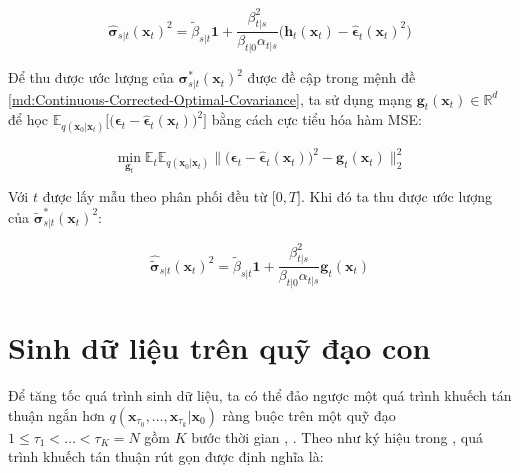 \documentclass[14pt, a4paper]{article}
\numberwithin{equation}{section}
\numberwithin{figure}{section}
\numberwithin{dl}{section}
\numberwithin{md}{section}
\numberwithin{bd}{section}
\numberwithin{dn}{section}
\numberwithin{hq}{section}
\begin{document}
    \begin{equation}
        \hat{\boldsymbol{\sigma}}_{s \vert t} (\boldsymbol{x}_t)^2 = \tilde{\beta}_{s \vert t} \boldsymbol{1} + \dfrac{\beta_{t \vert s}^2}{\beta_{t \vert 0} \alpha_{t \vert s}} \big( \boldsymbol{h}_t (\boldsymbol{x}_t) - \hat{\boldsymbol{\epsilon}}_t (\boldsymbol{x}_t)^2 \big)
    \end{equation}

    Để thu được ước lượng của $\boldsymbol{\sigma}_{s \vert t}^{\ast} (\boldsymbol{x}_t)^2$ được đề cập trong mệnh đề \ref{md:Continuous-Corrected-Optimal-Covariance}, ta sử dụng mạng $\boldsymbol{g}_t(\boldsymbol{x}_t) \in \mathbb{R}^d$ để học $\mathbb{E}_{q(\boldsymbol{x}_0 \vert \boldsymbol{x}_t)} \big \lbrack \big( \boldsymbol{\epsilon}_t - \hat{\boldsymbol{\epsilon}}_t (\boldsymbol{x}_t) \big)^2 \big \rbrack$ bằng cách cực tiểu hóa hàm MSE:

    \begin{equation}
        \min_{\boldsymbol{g}_t} \mathbb{E}_t \mathbb{E}_{q(\boldsymbol{x}_0 \vert \boldsymbol{x}_t)} \lVert \big( \boldsymbol{\epsilon}_t - \hat{\boldsymbol{\epsilon}}_t (\boldsymbol{x}_t) \big)^2 - \boldsymbol{g}_t (\boldsymbol{x}_t) \rVert_2^2
    \end{equation}

    Với $t$ được lấy mẫu theo phân phối đều từ $\lbrack 0, T \rbrack$. Khi đó ta thu được ước lượng của $\tilde{\boldsymbol{\sigma}}_{s \vert t}^{\ast} (\boldsymbol{x}_t)^2$:

    \begin{equation}
        \hat{\tilde{\boldsymbol{\sigma}}}_{s \vert t} (\boldsymbol{x}_t)^2 = \tilde{\beta}_{s \vert t} \boldsymbol{1} + \dfrac{\beta_{t \vert s}^2}{\beta_{t \vert 0} \alpha_{t \vert s}} \boldsymbol{g}_t (\boldsymbol{x}_t)
    \end{equation}

    \section{Sinh dữ liệu trên quỹ đạo con} \label{Appen:Section:Inference-on-Trajectories}

    Để tăng tốc quá trình sinh dữ liệu, ta có thể đảo ngược một quá trình khuếch tán thuận ngắn hơn $q(\boldsymbol{x}_{\tau_0}, \dots, \boldsymbol{x}_{\tau_k} \vert \boldsymbol{x}_0)$ ràng buộc trên một quỹ đạo $1 \leq \tau_1 < \dots < \tau_K = N$ gồm $K$ bước thời gian \cite{song2020denoising}, \cite{bao2021analytic}.
    Theo như ký hiệu trong \cite{bao2021analytic}, quá trình khuếch tán thuận rút gọn được định nghĩa là:
\end{document}
